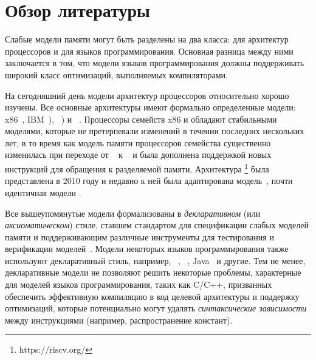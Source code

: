 \section{Обзор литературы}
\label{sec:related}

Слабые модели памяти могут быть разделены на два класса:
для архитектур процессоров и для языков программирования.
Основная разница между ними заключается в том, что модели языков программирования
должны поддерживать широкий класс оптимизаций, выполняемых компиляторами. 

На сегодняшний день модели архитектур процессоров относительно хорошо изучены. 
Все основные архитектуры имеют формально определенные модели:
x86~\cite{Sewell-al:CACM10}, IBM~\POWER \cite{Alglave-DAMP09,Sarkar-al:PLDI11,Alglave-al:TOPLAS14}),
\ARM~\cite{Chong-ASPLOS08, Alglave-DAMP09,Pulte-al:POPL18,Flur-al:POPL16,Alglave-al:TOPLAS14})
и \RISC~\cite{Pulte-al:POPL18}.
Процессоры семейств x86 и \POWER обладают стабильными моделями, 
которые не претерпевали изменений в течении последних нескольких лет, 
в то время как модель памяти процессоров семейства \ARM 
существенно изменилась при переходе от ~\cite{Alglave-al:TOPLAS14} 
к ~\cite{Pulte-al:POPL18}
и была дополнена поддержкой новых инструкций для обращения к разделяемой памяти.
Архитектура \RISC\footnote{https://riscv.org/} была представлена в 2010 году 
и недавно к ней была адаптирована модель~\cite{Pulte-al:POPL18}, 
почти идентичная модели .

Все вышеупомянутые модели формализованы в \emph{декларативном} 
(или \emph{аксиоматическом}) стиле, 
ставшем стандартом для спецификации слабых моделей памяти и 
поддерживающим различные инструменты для 
тестирования и верификации моделей~\cite{Alglave-al:TOPLAS14}.
Модели некоторых языков программирования также используют декларативный стиль, например,
\CPP~\cite{Batty-al:POPL11}, \JS~\cite{Watt-al:PLDI2020}, Java~\cite{Manson-al:POPL05} и другие.
Тем не менее, декларативные модели не позволяют решить некоторые проблемы, 
характерные для моделей языков программирования, таких как C/C++, 
призванных обеспечить эффективную компиляцию в код целевой архитектуры и 
поддержку оптимизаций, которые потенциально могут удалять 
\emph{синтаксические зависимости} между инструкциями 
(например, распространение констант). 


